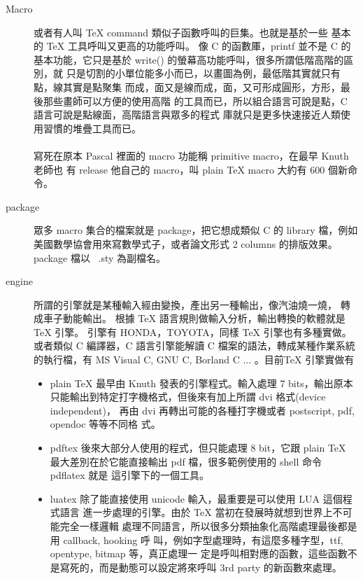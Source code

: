 \begin{description}
  \item [Macro] 或者有人叫 {\TeX} command 類似子函數呼叫的巨集。也就是基於一些
    基本的 \TeX{} 工具呼叫又更高的功能呼叫。 像 C 的函數厙，printf 並不是 C 的
    基本功能，它只是基於 write() 的螢幕高功能呼叫，很多所謂低階高階的區別，就
    只是切割的小單位能多小而已，以畫圖為例，最低階其實就只有點，線其實是點聚集
    而成，面又是線而成，面，又可形成圓形，方形，最後那些畫師可以方便的使用高階
    的工具而已，所以組合語言可說是點，C 語言可說是點線面，高階語言與眾多的程式
    庫就只是更多快速接近人類使用習慣的堆疊工具而已。
    \\\\
    寫死在原本 Pascal 裡面的 macro 功能稱 primitive macro，在最早 Knuth 老師也
    有 release 他自己的 macro，叫 plain \TeX{} macro 大約有 600 個新命令。
  \item [package] 眾多 macro 集合的檔案就是 package，把它想成類似 C 的 library
    檔，例如美國數學協會用來寫數學式子，或者論文形式 2 columns 的排版效果。
    package 檔以~ .sty 為副檔名。
  \item [engine] 所謂的引擎就是某種輸入經由變換，產出另一種輸出，像汽油燒一燒，
    轉成車子動能輸出。 根據 \TeX{} 語言規則做輸入分析，輸出轉換的軟體就是
    \TeX{} 引擎。 引擎有 HONDA，TOYOTA，同樣 \TeX{} 引擎也有多種實做。或者類似
    C 編譯器，C 語言引擎能解讀 C 檔案的語法，轉成某種作業系統的執行檔，有 MS
    Visual C, GNU C, Borland C ... 。目前{\TeX} 引擎實做有
  \begin{itemize}
    \item plain \TeX{} 最早由 Knuth 發表的引擎程式。輸入處理 7 bits，輸出原本
      只能輸出到特定打字機格式，但後來有加上所謂 dvi 格式(device independent)，
      再由 dvi 再轉出可能的各種打字機或者 postscript, pdf, opendoc 等等不同格
      式。
    \item pdftex 後來大部分人使用的程式，但只能處理 8 bit，它跟 plain \TeX{}
      最大差別在於它能直接輸出 pdf 檔，很多範例使用的 shell 命令 pdflatex 就是
      這引擎下的一個工具。
    \item luatex 除了能直接使用 unicode 輸入，最重要是可以使用 LUA 這個程式語言
      進一步處理的引擎。由於 \TeX{} 當初在發展時就想到世界上不可能完全一樣邏輯
      處理不同語言，所以很多分類抽象化高階處理最後都是用 callback, hooking 呼
      叫，例如字型處理時，有這麼多種字型，ttf, opentype, bitmap 等，真正處理一
      定是呼叫相對應的函數，這些函數不是寫死的，而是動態可以設定將來呼叫 3rd
      party 的新函數來處理。
      \\\\

\end{itemize}
\end{description}
